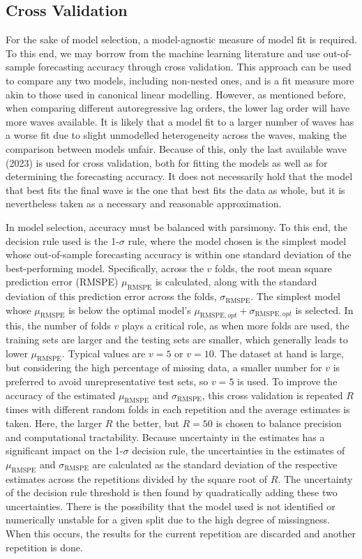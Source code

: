 \subsection{Cross Validation}
\label{sec:methods:cv}
For the sake of model selection, a model-agnostic measure of model fit is required. To this end, we may borrow from the
machine learning literature and use out-of-sample forecasting accuracy through cross validation.
This approach can be used to compare any two models, including non-nested ones, and is a fit measure more akin to those
used in canonical linear modelling.
However, as mentioned before, when comparing different autoregressive lag orders, the lower lag order will have
more waves available. It is likely that a model fit to a larger number of waves has a worse fit due to slight
unmodelled heterogeneity across the waves, making the comparison between models unfair. Because of this, only the last
available wave (2023) is used for cross validation, both for fitting the models as well as for determining the forecasting
accuracy. It does not necessarily hold that the model that best fits the final wave is the one that best fits
the data as whole, but it is nevertheless taken as a necessary and reasonable approximation.

In model selection, accuracy must be balanced with parsimony. To this end, the decision rule used is the 1-$\sigma$ rule,
where the model chosen is the simplest model whose out-of-sample forecasting accuracy is within one standard deviation
of the best-performing model. Specifically, across the $v$ folds, the root mean square prediction error (RMSPE)
$\mu_{\text{RMSPE}}$ is calculated, along with the standard deviation of this prediction error across the folds,
$\sigma_{\text{RMSPE}}$. The simplest model whose $\mu_{\text{RMSPE}}$ is below the optimal model's
$\mu_{\text{RMSPE},opt} + \sigma_{\text{RMSPE},opt}$ is selected.
In this, the number of folds $v$ plays a critical role, as when more folds are used, the training sets are larger
and the testing sets are smaller, which generally leads to lower $\mu_{\text{RMSPE}}$. Typical values are $v = 5$ or
$v = 10$. The dataset at hand is large, but considering the high percentage of missing data, a smaller number for
$v$ is preferred to avoid unrepresentative test sets, so $v = 5$ is used.
To improve the accuracy of the estimated $\mu_{\text{RMSPE}}$ and $\sigma_{\text{RMSPE}}$, this cross validation
is repeated $R$ times with different random folds in each repetition and the average estimates is taken.
Here, the larger $R$ the better, but $R = 50$ is chosen to balance precision and computational tractability.
Because uncertainty in the estimates has a significant impact on the 1-$\sigma$ decision rule,
the uncertainties in the estimates of $\mu_{\text{RMSPE}}$ and $\sigma_{\text{RMSPE}}$ are calculated as the standard
deviation of the respective estimates across the repetitions divided by the square root of $R$.
The uncertainty of the decision rule threshold is then found by quadratically adding these two uncertainties.
There is the possibility that the model used is not identified or numerically unstable for a given split due to the high
degree of missingness. When this occurs, the results for the current repetition are discarded and another repetition is
done.

